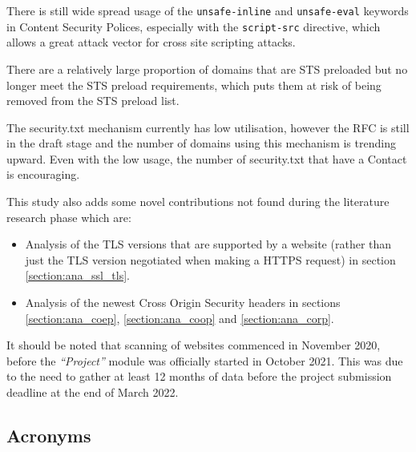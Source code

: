 \documentclass{mscreport}
\begin{document}
\vspace{0.3cm} \noindent
There is still wide spread usage of the \texttt{unsafe-inline} and \texttt{unsafe-eval} keywords in Content Security Polices, especially with the \texttt{script-src} directive, which allows a great attack vector for cross site scripting attacks.

\vspace{0.3cm} \noindent
There are a relatively large proportion of domains that are STS preloaded but no longer meet the STS preload requirements, which puts them at risk of being removed from the STS preload list.

\vspace{0.3cm} \noindent
The security.txt mechanism currently has low utilisation, however the RFC is still in the draft stage and the number of domains using this mechanism is trending upward. Even with the low usage, the number of security.txt that have a Contact is encouraging.

\vspace{0.3cm} \noindent
This study also adds some novel contributions not found during the literature research phase which are:
\begin{itemize}
	\setlength\itemsep{0.1em}
	\item Analysis of the TLS versions that are supported by a website (rather than just the TLS version negotiated when making a HTTPS request) in section \ref{section:ana_ssl_tls}.
	\item Analysis of the newest Cross Origin Security headers in sections \ref{section:ana_coep}, \ref{section:ana_coop} and \ref{section:ana_corp}.
\end{itemize}

\vspace{0.3cm} \noindent
It should be noted that scanning of websites commenced in November 2020, before the \textit{``Project''} module was officially started in October 2021. This was due to the need to gather at least 12 months of data before the project submission deadline at the end of March 2022.


\newpage
\begin{center}
\section*{Acronyms}
\end{center}
\end{document}
